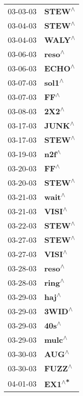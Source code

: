 \begin{supertabular}{p{0.08\textwidth}p{0.2\textwidth}}
 03-03-03 &    \textbf{STEW\textsuperscript{$\wedge$}} \\
 03-04-03 &    \textbf{STEW\textsuperscript{$\wedge$}} \\
 03-04-03 &    \textbf{WALY\textsuperscript{$\wedge$}} \\
 03-06-03 &    \textbf{reso\textsuperscript{$\wedge$}} \\
 03-06-03 &    \textbf{ECHO\textsuperscript{$\wedge$}} \\
 03-07-03 &    \textbf{sol1\textsuperscript{$\wedge$}} \\
 03-07-03 &      \textbf{FF\textsuperscript{$\wedge$}} \\
 03-08-03 &     \textbf{2X2\textsuperscript{$\wedge$}} \\
 03-17-03 &    \textbf{JUNK\textsuperscript{$\wedge$}} \\
 03-17-03 &    \textbf{STEW\textsuperscript{$\wedge$}} \\
 03-19-03 &     \textbf{n2f\textsuperscript{$\wedge$}} \\
 03-20-03 &      \textbf{FF\textsuperscript{$\wedge$}} \\
 03-20-03 &    \textbf{STEW\textsuperscript{$\wedge$}} \\
 03-21-03 &    \textbf{wait\textsuperscript{$\wedge$}} \\
 03-21-03 &    \textbf{VISI\textsuperscript{$\wedge$}} \\
 03-22-03 &    \textbf{STEW\textsuperscript{$\wedge$}} \\
 03-27-03 &    \textbf{STEW\textsuperscript{$\wedge$}} \\
 03-27-03 &    \textbf{VISI\textsuperscript{$\wedge$}} \\
 03-28-03 &    \textbf{reso\textsuperscript{$\wedge$}} \\
 03-28-03 &    \textbf{ring\textsuperscript{$\wedge$}} \\
 03-29-03 &     \textbf{haj\textsuperscript{$\wedge$}} \\
 03-29-03 &    \textbf{3WID\textsuperscript{$\wedge$}} \\
 03-29-03 &     \textbf{40s\textsuperscript{$\wedge$}} \\
 03-29-03 &    \textbf{mulc\textsuperscript{$\wedge$}} \\
 03-30-03 &     \textbf{AUG\textsuperscript{$\wedge$}} \\
 03-30-03 &    \textbf{FUZZ\textsuperscript{$\wedge$}} \\
 04-01-03 &    \textbf{EX1\textsuperscript{$\wedge$*}} \\

\end{supertabular}
